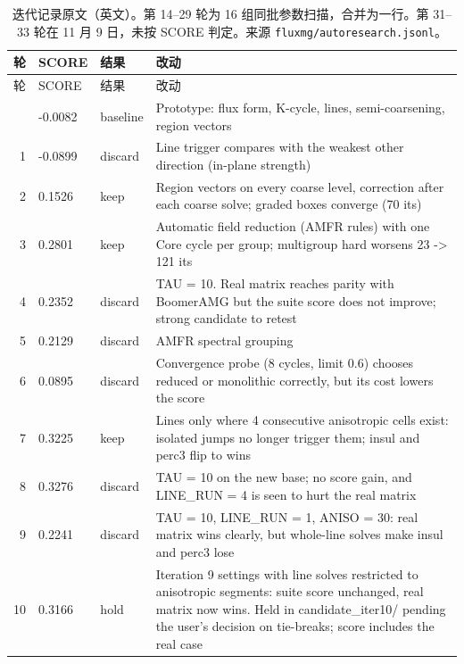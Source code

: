 {\scriptsize\setlength{\tabcolsep}{3pt}
\begin{longtable}{rlll}
\caption{迭代记录原文（英文）。第 14--29 轮为 16 组同批参数扫描，合并为一行。第 31--33 轮在 11 月 9 日，未按 SCORE 判定。来源 \texttt{fluxmg/autoresearch.jsonl}。}\\
\toprule
轮 & SCORE & 结果 & 改动 \\
\midrule
\endfirsthead
\toprule
轮 & SCORE & 结果 & 改动 \\
\midrule
\endhead
\bottomrule
\endlastfoot
0 & -0.0082 & baseline & \parbox[t]{9.2cm}{\raggedright Prototype: flux form, K-cycle, lines, semi-coarsening, region vectors} \\
1 & -0.0899 & discard & \parbox[t]{9.2cm}{\raggedright Line trigger compares with the weakest other direction (in-plane strength)} \\
2 & 0.1526 & keep & \parbox[t]{9.2cm}{\raggedright Region vectors on every coarse level, correction after each coarse solve; graded boxes converge (70 its)} \\
3 & 0.2801 & keep & \parbox[t]{9.2cm}{\raggedright Automatic field reduction (AMFR rules) with one Core cycle per group; multigroup hard worsens 23 -\textgreater{} 121 its} \\
4 & 0.2352 & discard & \parbox[t]{9.2cm}{\raggedright TAU = 10. Real matrix reaches parity with BoomerAMG but the suite score does not improve; strong candidate to retest} \\
5 & 0.2129 & discard & \parbox[t]{9.2cm}{\raggedright AMFR spectral grouping} \\
6 & 0.0895 & discard & \parbox[t]{9.2cm}{\raggedright Convergence probe (8 cycles, limit 0.6) chooses reduced or monolithic correctly, but its cost lowers the score} \\
7 & 0.3225 & keep & \parbox[t]{9.2cm}{\raggedright Lines only where 4 consecutive anisotropic cells exist: isolated jumps no longer trigger them; insul and perc3 flip to wins} \\
8 & 0.3276 & discard & \parbox[t]{9.2cm}{\raggedright TAU = 10 on the new base; no score gain, and LINE\_RUN = 4 is seen to hurt the real matrix} \\
9 & 0.2241 & discard & \parbox[t]{9.2cm}{\raggedright TAU = 10, LINE\_RUN = 1, ANISO = 30: real matrix wins clearly, but whole-line solves make insul and perc3 lose} \\
10 & 0.3166 & hold & \parbox[t]{9.2cm}{\raggedright Iteration 9 settings with line solves restricted to anisotropic segments: suite score unchanged, real matrix now wins. Held in candidate\_iter10/ pending the user's decision on tie-breaks; score includes the real case} \\

\end{longtable}}
